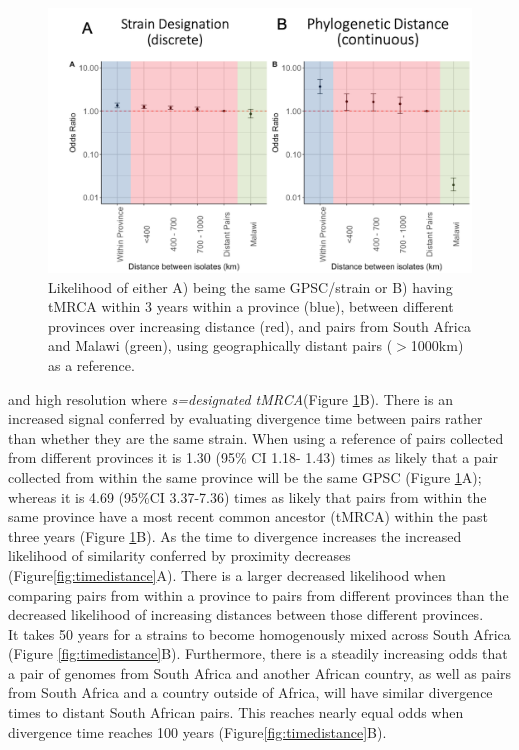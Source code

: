 \documentclass{article}
\begin{document}
\begin{figure}[H]
\centering
    \includegraphics[width=\textwidth]{strainvstmrca.png}
    \caption{Likelihood of either A) being the same GPSC/strain or B) having tMRCA within 3 years within a province (blue), between different provinces over increasing distance (red), and pairs from South Africa and Malawi (green), using geographically distant pairs ($>$1000km) as a reference.}
      \label{fig:strainvstmrca}
\end{figure}
and high resolution where \textit{s=designated tMRCA}(Figure \ref{fig:strainvstmrca}B).  There is an increased signal conferred by evaluating divergence time between pairs rather than whether they are the same strain. When using a reference of pairs collected from different provinces it is 1.30 (95\% CI 1.18- 1.43) times as likely that a pair collected from within the same province will be the same GPSC (Figure \ref{fig:strainvstmrca}A); whereas it is 4.69 (95\%CI 3.37-7.36) times as likely that pairs from within the same province have a most recent common ancestor (tMRCA) within the past three years (Figure \ref{fig:strainvstmrca}B). As the time to divergence increases the increased likelihood of similarity conferred by proximity decreases (Figure\ref{fig:timedistance}A). There is a larger decreased likelihood when comparing pairs from within a province to pairs from different provinces than the decreased likelihood of increasing distances between those different provinces. \\It takes 50 years for a strains to become homogenously mixed across South Africa (Figure \ref{fig:timedistance}B). Furthermore, there is  a steadily increasing odds that a pair of genomes from South Africa and another African country, as well as pairs from South Africa and a country outside of Africa, will have similar divergence times to distant South African pairs. This reaches nearly equal odds when divergence time reaches 100 years (Figure\ref{fig:timedistance}B). 
\end{document}
